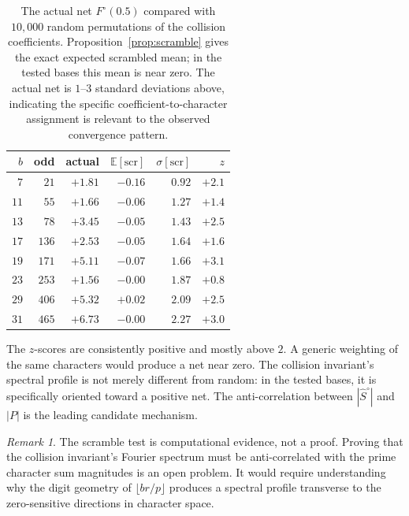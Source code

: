 \documentclass[12pt]{amsart}
\theoremstyle{definition}
\theoremstyle{remark}
\newtheorem{remark}[theorem]{Remark}
\begin{document}
\begin{table}[h]
\centering
\begin{tabular}{rrrrrr}
\toprule
$b$ & odd & actual & $\mathbb{E}[\text{scr}]$ &
$\sigma[\text{scr}]$ & $z$ \\
\midrule
$7$ & $21$ & $+1.81$ & $-0.16$ & $0.92$ & $+2.1$ \\
$11$ & $55$ & $+1.66$ & $-0.06$ & $1.27$ & $+1.4$ \\
$13$ & $78$ & $+3.45$ & $-0.05$ & $1.43$ & $+2.5$ \\
$17$ & $136$ & $+2.53$ & $-0.05$ & $1.64$ & $+1.6$ \\
$19$ & $171$ & $+5.11$ & $-0.07$ & $1.66$ & $+3.1$ \\
$23$ & $253$ & $+1.56$ & $-0.00$ & $1.87$ & $+0.8$ \\
$29$ & $406$ & $+5.32$ & $+0.02$ & $2.09$ & $+2.5$ \\
$31$ & $465$ & $+6.73$ & $-0.00$ & $2.27$ & $+3.0$ \\
\bottomrule
\end{tabular}
\caption{The actual net $F^{\circ}(0.5)$ compared with
$10{,}000$ random permutations of the collision
coefficients. Proposition~\ref{prop:scramble} gives
the exact expected scrambled mean; in the tested
bases this mean is near zero. The actual net
is $1$--$3$ standard deviations above, indicating
the specific coefficient-to-character assignment is
relevant to the observed convergence pattern.}
\label{tab:scramble}
\end{table}

The $z$-scores are consistently positive and mostly
above $2$. A generic weighting of the same characters
would produce a net near zero. The collision
invariant's spectral profile is not merely different
from random: in the tested bases, it is specifically
oriented toward a positive net. The anti-correlation
between $|\hat{S}^{\circ}|$ and $|P|$ is the leading
candidate mechanism.

\begin{remark}
The scramble test is computational evidence, not a
proof. Proving that the collision invariant's Fourier
spectrum must be anti-correlated with the prime
character sum magnitudes is an open problem. It would
require understanding why the digit geometry of
$\lfloor br/p \rfloor$ produces a spectral profile
transverse to the zero-sensitive directions in
character space.
\end{remark}

\end{document}
